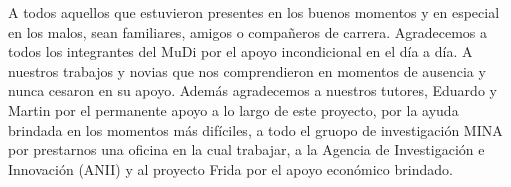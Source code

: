 
\begin{acknowledgements}      
A todos aquellos que estuvieron presentes en los buenos momentos y en especial en los malos, sean familiares, amigos o compa\~neros de carrera. Agradecemos a todos los integrantes del MuDi por el apoyo incondicional en el día a día. A nuestros trabajos y novias que nos comprendieron en momentos de ausencia y nunca cesaron en su apoyo. Adem\'as agradecemos a nuestros tutores, Eduardo y Martin por el permanente apoyo a lo largo de este proyecto, por la ayuda brindada en los momentos m\'as difíciles, a todo el gruopo de investigaci\'on MINA por prestarnos una oficina en la cual trabajar, a la Agencia de Investigaci\'on e Innovaci\'on (ANII) y al proyecto Frida por el apoyo económico brindado.


\end{acknowledgements}
